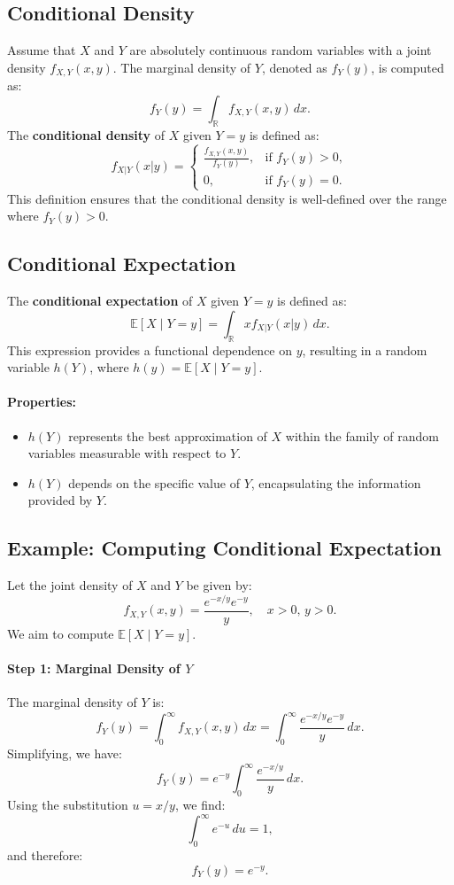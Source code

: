\subsection{Conditional Density}
Assume that \( X \) and \( Y \) are absolutely continuous random variables with a joint density \( f_{X,Y}(x,y) \). The marginal density of \( Y \), denoted as \( f_Y(y) \), is computed as:
\[
f_Y(y) = \int_{\mathbb{R}} f_{X,Y}(x,y) \, dx.
\]
The \textbf{conditional density} of \( X \) given \( Y=y \) is defined as:
\[
f_{X|Y}(x|y) =
\begin{cases} 
\frac{f_{X,Y}(x,y)}{f_Y(y)}, & \text{if } f_Y(y) > 0, \\
0, & \text{if } f_Y(y) = 0.
\end{cases}
\]
This definition ensures that the conditional density is well-defined over the range where \( f_Y(y) > 0 \).

\subsection{Conditional Expectation}
The \textbf{conditional expectation} of \( X \) given \( Y=y \) is defined as:
\[
\mathbb{E}[X \mid Y=y] = \int_{\mathbb{R}} x f_{X|Y}(x|y) \, dx.
\]
This expression provides a functional dependence on \( y \), resulting in a random variable \( h(Y) \), where \( h(y) = \mathbb{E}[X \mid Y=y] \).

\paragraph{Properties:}
\begin{itemize}
    \item \( h(Y) \) represents the best approximation of \( X \) within the family of random variables measurable with respect to \( Y \).
    \item \( h(Y) \) depends on the specific value of \( Y \), encapsulating the information provided by \( Y \).
\end{itemize}

\subsection{Example: Computing Conditional Expectation}
Let the joint density of \( X \) and \( Y \) be given by:
\[
f_{X,Y}(x,y) = \frac{e^{-x/y} e^{-y}}{y}, \quad x > 0, \, y > 0.
\]
We aim to compute \( \mathbb{E}[X \mid Y=y] \).

\paragraph{Step 1: Marginal Density of \( Y \)}
The marginal density of \( Y \) is:
\[
f_Y(y) = \int_{0}^{\infty} f_{X,Y}(x,y) \, dx = \int_{0}^{\infty} \frac{e^{-x/y} e^{-y}}{y} \, dx.
\]
Simplifying, we have:
\[
f_Y(y) = e^{-y} \int_{0}^{\infty} \frac{e^{-x/y}}{y} \, dx.
\]
Using the substitution \( u = x/y \), we find:
\[
\int_{0}^{\infty} e^{-u} \, du = 1,
\]
and therefore:
\[
f_Y(y) = e^{-y}.
\]

